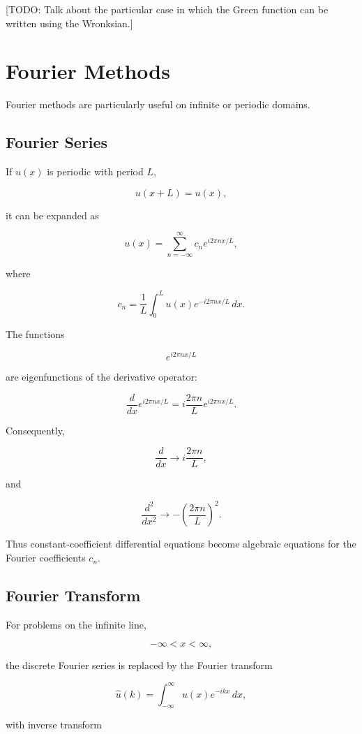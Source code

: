 \documentclass[aps,prl,twocolumn,groupedaddress]{revtex4-2}
\begin{document}
{\color{red}[TODO: Talk about the particular case in which the Green function can be written using the Wronksian.]}

\section{Fourier Methods}

Fourier methods are particularly useful on infinite or periodic domains.

\subsection{Fourier Series}

If $u(x)$ is periodic with period $L$,

$$
u(x+L)=u(x),
$$

it can be expanded as

$$
u(x)
=
\sum_{n=-\infty}^{\infty}
c_n e^{i2\pi nx/L},
$$

where

$$
c_n
=
\frac{1}{L}
\int_0^L
u(x)e^{-i2\pi nx/L}\,dx.
$$

The functions

$$
e^{i2\pi nx/L}
$$

are eigenfunctions of the derivative operator:

$$
\frac{d}{dx}
e^{i2\pi nx/L}
=
i\frac{2\pi n}{L}
e^{i2\pi nx/L}.
$$

Consequently,

$$
\frac{d}{dx}
\longrightarrow
i\frac{2\pi n}{L},
$$

and

$$
\frac{d^2}{dx^2}
\longrightarrow
-\left(\frac{2\pi n}{L}\right)^2.
$$

Thus constant-coefficient differential equations become algebraic equations for the Fourier coefficients $c_n$.

\subsection{Fourier Transform}

For problems on the infinite line,

$$
-\infty<x<\infty,
$$

the discrete Fourier series is replaced by the Fourier transform

$$
\hat u(k)
=
\int_{-\infty}^{\infty}
u(x)e^{-ikx}\,dx,
$$

with inverse transform
\end{document}
